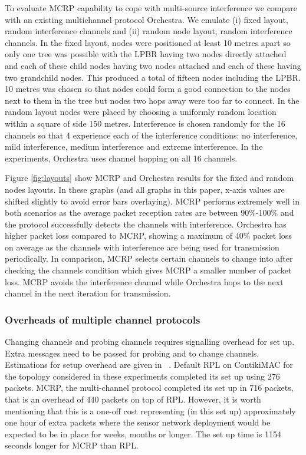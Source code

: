 To evaluate MCRP capability to cope with multi-source interference we compare with an existing multichannel protocol Orchestra.  We emulate (i) fixed layout, random interference channels and (ii) random node layout, random interference channels.
In the fixed layout, nodes were positioned at least 10 metres apart so  only one tree was possible with the LPBR having two nodes directly attached and each of these child nodes having two nodes attached and each of these having two grandchild nodes. This produced a total of fifteen nodes including the LPBR.  10 metres was chosen so that nodes could form a good connection to the nodes next to them in the tree but nodes two hops away were too far to connect. In the random layout nodes were placed by choosing a uniformly random location within a square of side 150 metres.
Interference is chosen randomly for the 16 channels so that 4 experience each of the interference conditions: no interference, mild interference, medium interference and extreme interference.  In the experiments, Orchestra uses channel hopping on all 16 channels. 


Figure \ref{fig:layouts} show MCRP and Orchestra results for the fixed and random nodes layouts.  In these graphs (and all graphs in this paper, x-axis values are shifted slightly to avoid error bars overlaying).
MCRP performs extremely well in both scenarios as the average packet reception rates are between 90\%-100\% and the protocol successfully detects the channels with interference.
Orchestra has higher packet loss compared to MCRP, showing a maximum of 40\% packet loss on average as the channels with interference are being used for transmission periodically. 
In comparison, MCRP selects certain channels to change into after checking the channels condition which gives MCRP a smaller number of packet loss.
MCRP avoids the interference channel while Orchestra hops to the next channel in the next iteration for transmission.

\subsubsection{Overheads of multiple channel protocols}

Changing channels and probing channels requires signalling overhead for set up.  Extra messages need to be passed for probing and to change channels.  Estimations for setup overhead are given in ~\cite{mcrp}.  Default RPL on ContikiMAC for the topology considered in these experiments completed its set up using 276 packets. MCRP, the multi-channel protocol completed its set up in 716 packets, that is an overhead of 440 packets on top of RPL.  However, it is worth mentioning that this is a one-off cost representing (in this set up) approximately one hour of extra packets where the sensor network deployment would be expected to be in place for weeks, months or longer.  The set up time is 1154 seconds longer for MCRP than RPL.


